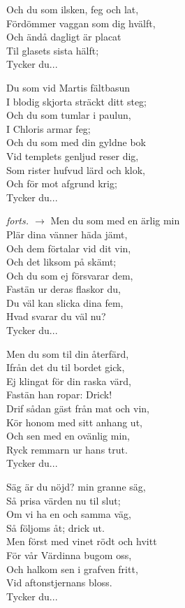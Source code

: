 Och du som ilsken, feg och lat,\\
Fördömmer vaggan som dig hvälft,\\
Och ändå dagligt är placat\\
Til glasets sista hälft;\\
Tycker du...\par
\vspace{10pt}		  
Du som vid Martis fältbasun\\
I blodig skjorta sträckt ditt steg;\\
Och du som tumlar i paulun,\\
I Chloris armar feg;\\
Och du som med din gyldne bok\\
Vid templets genljud reser dig,\\
Som rister hufvud lärd och klok,\\
Och för mot afgrund krig;\\
Tycker du...\par
\vfill
\hfill {\footnotesize\textit{forts. $\rightarrow$}}
\newpage
Men du som med en ärlig min\\
Plär dina vänner häda jämt,\\
Och dem förtalar vid dit vin,\\
Och det liksom på skämt;\\
Och du som ej försvarar dem,\\
Fastän ur deras flaskor du,\\
Du väl kan slicka dina fem,\\
Hvad svarar du väl nu?\\
Tycker du...\par
\vspace{10pt}
Men du som til din återfärd,\\
Ifrån det du til bordet gick,\\
Ej klingat för din raska värd,\\
Fastän han ropar: Drick!\\
Drif sådan gäst från mat och vin,\\
Kör honom med sitt anhang ut,\\
Och sen med en ovänlig min,\\
Ryck remmarn ur hans trut.\\
Tycker du...\par
\vspace{10pt}				   
Säg är du nöjd? min granne säg,\\
Så prisa värden nu til slut;\\
Om vi ha en och samma väg,\\
Så följoms åt; drick ut.\\
Men först med vinet rödt och hvitt\\
För vår Värdinna bugom oss,\\
Och halkom sen i grafven fritt,\\
Vid aftonstjernans bloss.\\
Tycker du...
